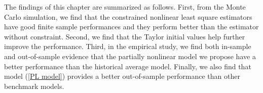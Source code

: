 \documentclass[a4paper,12pt,times,numbered,print,index]{report}
\numberwithin{equation}{section}
\begin{document}





The findings of this chapter are summarized as follows. First, from the Monte Carlo simulation, we find that the constrained nonlinear least square estimators have good finite sample performances and they perform better than the estimator without constraint.  Second, we find that the Taylor initial values help further improve the performance. Third, in the empirical study, we find both in-sample and out-of-sample evidence that the partially nonlinear model we propose have a better performance than the historical average model. Finally, we also find that model (\ref{PL model}) provides a better out-of-sample performance than other benchmark models. 
\end{document}

